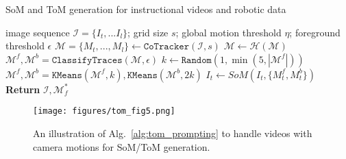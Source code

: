 \begin{algorithm}[t]
\caption{SoM and ToM generation for instructional videos and robotic data}
\label{alg:som_tom_generation}
\begin{algorithmic}[1]
    \Require image sequence $\mathcal{I} = \{I_t,...I_{l}\}$; grid size $s$; global motion threshold $\eta$; foreground threshold $\epsilon$
    \State $\mathcal{M} = \{M_t,...,M_{l}\} \gets \texttt{CoTracker}(\mathcal{I}, s)$
      \State $\mathcal{M} \gets \mathcal{H}(\mathcal{M})$ \textcolor{commentcolor}{}
    \EndIf
    \State $\mathcal{M}^f, \mathcal{M}^b = \texttt{ClassifyTraces}(\mathcal{M}, \epsilon)$\textcolor{commentcolor}{}
    \State $k \gets \texttt{Random}(1, \min(5, |\mathcal{M}^f|))$ 
    \State $\mathcal{M}^f,\mathcal{M}^b = \texttt{KMeans}(\mathcal{M}^f, k), \texttt{KMeans}(\mathcal{M}^b, 2k)$    
    \textcolor{commentcolor}{}
    \State $I_t \gets SoM(I_t, \{M^f_t, M^b_t\})$ \textcolor{commentcolor}{}
    \State \textbf{Return} $\mathcal{I}, \mathcal{M}_f^*$
\end{algorithmic}
\label{alg:tom_prompting}
\end{algorithm}
\begin{figure}[t]
    \centering
    \texttt{[image: figures/tom\_fig5.png]}
    \vspace{-10pt}
    \caption{An illustration of Alg.~\ref{alg:tom_prompting} to handle videos with camera motions for SoM/ToM generation.}
    \label{fig:homo}
\end{figure}
